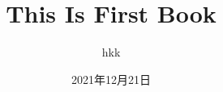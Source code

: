 \documentclass[a4paper]{book}
\begin{document}
    \pagestyle{empty}
    \title{This Is First Book}
    \author{hkk}
    \date{2021年12月21日}
    \maketitle

    
    \listoftodos %
    \tableofcontents %

    
    
    
    

    
    
    
\listoffigures
\listoftables
\printindex
\end{document}
